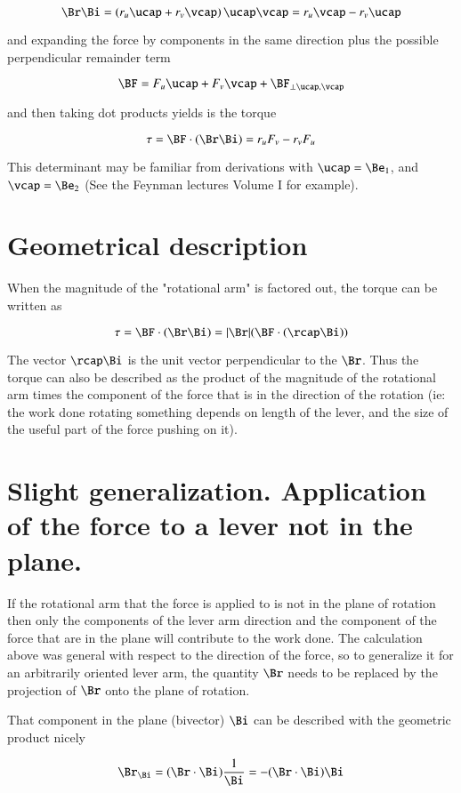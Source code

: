 \[
\Br \Bi =
\left(
r_u \ucap + r_v \vcap
\right)
\ucap \vcap
= 
r_u \vcap  
- r_v \ucap
\]

and expanding the force by components in the same direction plus the possible perpendicular remainder term

\[
\BF  = F_u \ucap + F_v \vcap + \BF _{\perp \ucap,\vcap}
\]

and then taking dot products yields is the torque

\[
\tau = \BF \cdot (\Br  \Bi ) = r_u F_v - r_v F_u
\]

This determinant may be familiar from derivations with $\ucap = \Be _1$, and $\vcap = \Be _2$ (See the Feynman lectures Volume I for example).

\section{Geometrical description }

When the magnitude of the "rotational arm" is factored out, the torque can be written as

\[
\tau = \BF \cdot (\Br  \Bi ) = |\Br |  (\BF \cdot (\rcap \Bi ))
\]

The vector $\rcap \Bi $ is the unit vector perpendicular to the $\Br$.  Thus the torque can also be described as the product of the magnitude of the rotational arm times the component of the force that is in the direction of the rotation (ie: the work done rotating something depends on length of the lever, and the size of the useful part of the force pushing on it).

\section{Slight generalization.  Application of the force to a lever not in the plane. }

If the rotational arm that the force is applied to is not in the plane of rotation then only the components of the lever arm direction and the component of the force that are in the plane will contribute to the work done.  The calculation above was general with respect to the direction of the force, so to generalize
it for an arbitrarily oriented lever arm, the quantity $\Br$ needs to be replaced by the projection of $\Br$ onto the plane of rotation.

That component in the plane (bivector) $\Bi$ can be described with the geometric product nicely

\[
\Br _{\Bi } =  (\Br  \cdot \Bi ) \frac{1}{\Bi } =  -(\Br  \cdot \Bi ) \Bi 
\]

